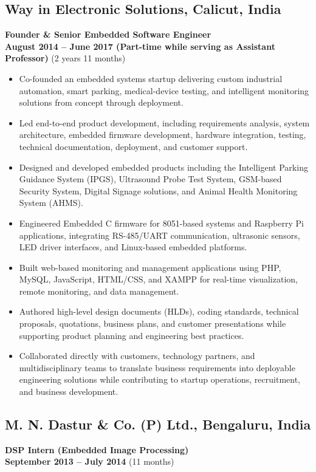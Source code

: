 \documentclass[a4paper,10pt]{article}
\begin{document}
\subsection{Way in Electronic Solutions, Calicut, India}
\textbf{Founder \& Senior Embedded Software Engineer} \\
\hfill \textbf{August 2014 -- June 2017 (Part-time while serving as Assistant Professor)} (2 years 11 months)

\begin{itemize}
\item Co-founded an embedded systems startup delivering custom industrial automation, smart parking, medical-device testing, and intelligent monitoring solutions from concept through deployment.
\item Led end-to-end product development, including requirements analysis, system architecture, embedded firmware development, hardware integration, testing, technical documentation, deployment, and customer support.
\item Designed and developed embedded products including the Intelligent Parking Guidance System (IPGS), Ultrasound Probe Test System, GSM-based Security System, Digital Signage solutions, and Animal Health Monitoring System (AHMS).
\item Engineered Embedded C firmware for 8051-based systems and Raspberry Pi applications, integrating RS-485/UART communication, ultrasonic sensors, LED driver interfaces, and Linux-based embedded platforms.
\item Built web-based monitoring and management applications using PHP, MySQL, JavaScript, HTML/CSS, and XAMPP for real-time visualization, remote monitoring, and data management.
\item Authored high-level design documents (HLDs), coding standards, technical proposals, quotations, business plans, and customer presentations while supporting product planning and engineering best practices.
\item Collaborated directly with customers, technology partners, and multidisciplinary teams to translate business requirements into deployable engineering solutions while contributing to startup operations, recruitment, and business development.
\end{itemize}

\subsection{M. N. Dastur \& Co. (P) Ltd., Bengaluru, India}
\textbf{DSP Intern (Embedded Image Processing)} \\
\hfill \textbf{September 2013 -- July 2014} (11 months)
\end{document}
